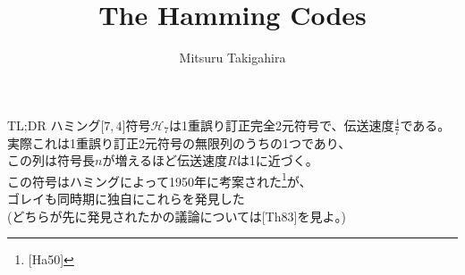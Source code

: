 \documentclass[dvipdfmx,10pt,jsarticle]{beamer}
\title{The Hamming Codes}
\author{Mitsuru Takigahira}
\date[2017/12/8]{}
\newcommand{\code}[1]{\mathcal{#1}}
\newcommand{\bracket}[1]{\lbrack{} #1 \rbrack}
\newcommand{\vcode}[2]{$\bracket{#1 , #2}$}
\begin{document}
  \frame{\maketitle}
  \begin{frame}{TL;DR}
    ハミング\vcode74符号$\code{H}_7$は1重誤り訂正完全2元符号で、伝送速度$\frac 47$である。 \\
    実際これは1重誤り訂正2元符号の無限列のうちの1つであり、\\
    この列は符号長$n$が増えるほど伝送速度$R$は1に近づく。 \\
    この符号はハミングによって1950年に考案された\footnote{[Ha50]}が、 \\
    ゴレイも同時期に独自にこれらを発見した \\
    (どちらが先に発見されたかの議論については[Th83]を見よ。)
  \end{frame}
\end{document}
